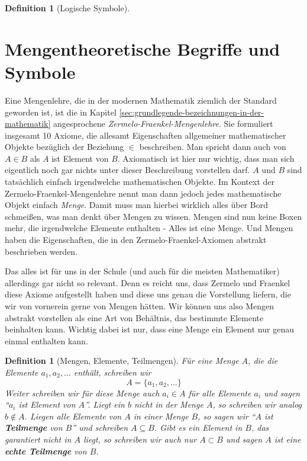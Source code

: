 \documentclass[11pt,reqno, a4paper]{book}
\renewcommand{\textbf}[1]{{\normalfont\bf #1}}
\theoremstyle{mystyle}
\newtheorem{definition}[theorem]{Definition}
\theoremstyle{definition}
\numberwithin{equation}{chapter}
\begin{document}
\begin{definition}[Logische Symbole] %
    
\end{definition}

\section{Mengentheoretische Begriffe und Symbole}
Eine Mengenlehre, die in der modernen Mathematik ziemlich der Standard geworden ist, ist die in Kapitel \ref{sec:grundlegende-bezeichnungen-in-der-mathematik} angesprochene \textit{Zermelo-Fraenkel-Mengenlehre}. Sie formuliert insgesamt 10 Axiome, die allesamt Eigenschaften allgemeiner mathematischer Objekte bezüglich der Beziehung \(\in\) beschreiben. Man spricht dann auch von \(A \in B\) als \(A\) ist Element von \(B\). Axiomatisch ist hier nur wichtig, dass man sich eigentlich noch gar nichts unter dieser Beschreibung vorstellen darf. \(A\) und \(B\) sind tatsächlich einfach irgendwelche mathematischen Objekte. Im Kontext der Zermelo-Fraenkel-Mengenlehre nennt man dann jedoch jedes mathematische Objekt einfach \textit{Menge}. Damit muss man hierbei wirklich alles über Bord schmeißen, was man denkt über Mengen zu wissen. Mengen sind nun keine Boxen mehr, die irgendwelche Elemente enthalten - Alles ist eine Menge. Und Mengen haben die Eigenschaften, die in den Zermelo-Fraenkel-Axiomen abstrakt beschrieben werden. 

Das alles ist für uns in der Schule (und auch für die meisten Mathematiker) allerdings gar nicht so relevant. Denn es reicht uns, dass Zermelo und Fraenkel diese Axiome aufgestellt haben und diese uns genau die Vorstellung liefern, die wir von vornerein gerne von Mengen hätten. Wir können uns also Mengen abstrakt vorstellen als eine Art von Behältnis, das bestimmte Elemente beinhalten kann. Wichtig dabei ist nur, dass eine Menge ein Element nur genau einmal enthalten kann. 

\begin{definition}[Mengen, Elemente, Teilmengen]
    Für eine Menge \(A\), die die Elemente \(a_1, a_2 , \dots\) enthält, schreiben wir 
    \begin{equation*}
        A = \{a_1, a_2, \dots \}
    \end{equation*}
    Weiter schreiben wir für diese Menge auch \(a_i \in A\) für alle Elemente \(a_i\) und sagen "`\(a_i\) ist Element von \(A\)"'. Liegt ein \(b\) nicht in der Menge \(A\), so schreiben wir analog \(b \notin A\). Liegen alle Elemente von \(A\) in einer Menge \(B\), so sagen wir "`\(A\) ist \textbf{Teilmenge} von \(B\)"' und schreiben \(A \subseteq B\). Gibt es ein Element in \(B\), das garantiert nicht in \(A\) liegt, so schreiben wir auch nur \(A \subset B\) und sagen \(A\) ist eine \textbf{echte Teilmenge} von \(B\). 
\end{definition}
\end{document}
